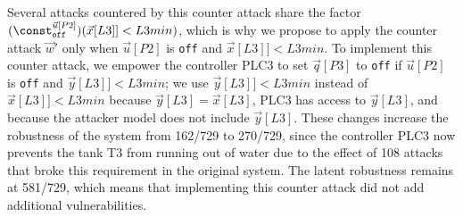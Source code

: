 {Several attacks countered by this counter attack share the factor $(\const^{\vec{u}[P2]}_{\texttt{off}})(\vec{x}[L3]]<L3min)$, which is why we propose to apply the counter attack $\vec{w}'$ only when $\vec{u}[P2]$ is \texttt{off} and $\vec{x}[L3]]<L3min$. To implement this counter attack, we empower the controller PLC3 to set $\vec{q}[P3]$ to \texttt{off} if $\vec{u}[P2]$ is \texttt{off} and $\vec{y}[L3]]<L3min$; we use $\vec{y}[L3]]<L3min$ instead of $\vec{x}[L3]]<L3min$ because $\vec{y}[L3]=\vec{x}[L3]$, PLC3 has access to $\vec{y}[L3]$, and because the attacker model does not include $\vec{y}[L3]$. These changes increase the robustness of the system from 162/729 to 270/729, since the controller PLC3 now prevents the tank T3 from running out of water due to the effect of 108 attacks that broke this requirement in the original system. The latent robustness remains at 581/729, which means that implementing this counter attack did not add additional vulnerabilities.




}
